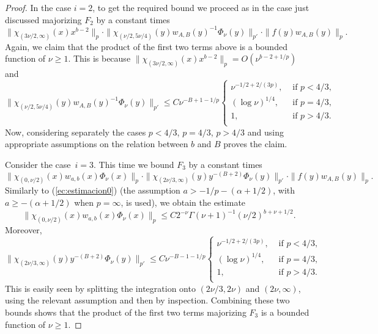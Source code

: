 \documentclass[leqno,a4paper]{amsart}
\begin{document}
\begin{proof}
In the case $i=2$, to get the required bound we proceed as in the case just discussed
majorizing $F_2$ by a constant times
\begin{equation*}
\|\chi_{(3\nu/2,\infty)}(x)x^{b-2}\|_{p}\cdot
\|\chi_{(\nu/2,5\nu/4)}(y)w_{A,B}(y)^{-1}\Phi_\nu(y)\|_{p'}\cdot
\|f(y)w_{A,B}(y)\|_p.
\end{equation*}
Again, we claim that the product of the first two terms
above is a bounded function of $\nu\ge1$. This is because
$\|\chi_{(3\nu/2,\infty)}(x)x^{b-2}\|_{p}=O(\nu^{b-2+1/p})$ and
\begin{equation*}
\|\chi_{(\nu/2,5\nu/4)}(y)w_{A,B}(y)^{-1}\Phi_\nu(y)\|_{p'}
\le C\nu^{-B+1-1/p}
\begin{cases}
\nu^{-1/2+2/(3p)}, & \text{ if } p<4/3,\\
(\log \nu)^{1/4}, & \text{ if } p=4/3,\\
1, & \text{ if } p>4/3.\\
\end{cases}
\end{equation*}
Now, considering separately the cases $p<4/3$, $p=4/3$, $p>4/3$ and using
appropriate assumptions on the relation between $b$ and $B$ proves the claim.

Consider the case~$i=3$. This time we bound $F_3$ by a constant times
\begin{equation*}
\|\chi_{(0,\nu/2)}(x)w_{a,b}(x)\Phi_\nu(x) \|_{p}\cdot
\|\chi_{(2\nu/3,\infty)}(y)y^{-(B+2)}\Phi_\nu(y)\|_{p'}\cdot
\|f(y)w_{A,B}(y)\|_p.
\end{equation*}
Similarly to (\ref{ec:estimacion0}) (the assumption
$a>-1/p-(\alpha+1/2)$, with $a\ge-(\alpha+1/2)$ when $p=\infty$, is used),
we obtain the estimate
\begin{equation*}
\|\chi_{(0,\nu/2)}(x)w_{a,b}(x)\Phi_\nu(x) \|_{p}
\le C 2^{-\nu}\Gamma(\nu+1)^{-1}(\nu/2)^{b+\nu+1/2}.
\end{equation*}
Moreover,
\begin{equation*}
\|\chi_{(2\nu/3,\infty)}(y)y^{-(B+2)}\Phi_\nu(y)\|_{p'} \le C
\nu^{-B-1-1/p}
\begin{cases}
\nu^{-1/2+2/(3p)}, & \text{ if } p<4/3,\\
(\log \nu)^{1/4}, & \text{ if } p=4/3,\\
1, & \text{ if } p>4/3.\\
\end{cases}
\end{equation*}
This is easily seen by splitting the integration onto $(2\nu/3,2\nu)$ and
$(2\nu,\infty)$, using the relevant assumption and then by inspection.
Combining these two bounds shows that the product of the first two
terms majorizing $F_3$ is a bounded function of $\nu\ge1$.


\end{proof}
\end{document}

